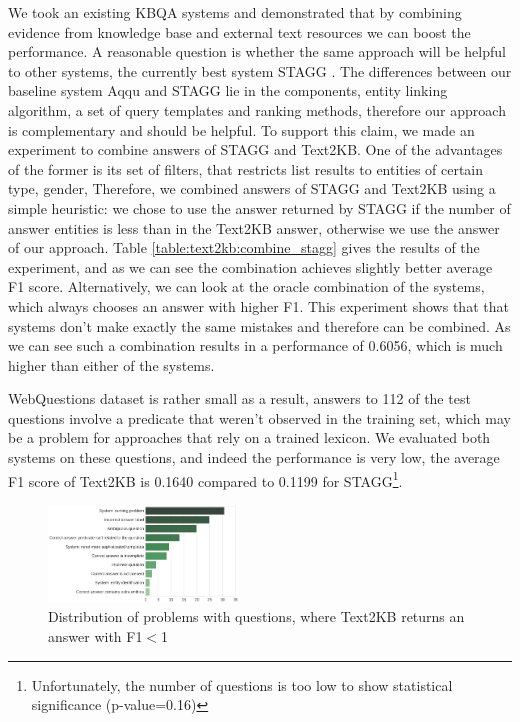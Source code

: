 We took an existing KBQA systems and demonstrated that by combining evidence from knowledge base and external text resources we can boost the performance.
A reasonable question is whether the same approach will be helpful to other systems, \eg the currently best system STAGG \cite{yih:ACL:2015:STAGG}.
The differences between our baseline system Aqqu and STAGG lie in the components, \ie entity linking algorithm, a set of query templates and ranking methods, therefore our approach is complementary and should be helpful.
To support this claim, we made an experiment to combine answers of STAGG and Text2KB.
One of the advantages of the former is its set of filters, that restricts list results to entities of certain type, gender, \etc
Therefore, we combined answers of STAGG and Text2KB using a simple heuristic: we chose to use the answer returned by STAGG if the number of answer entities is less than in the Text2KB answer, otherwise we use the answer of our approach.
Table \ref{table:text2kb:combine_stagg} gives the results of the experiment, and as we can see the combination achieves slightly better average F1 score.
Alternatively, we can look at the oracle combination of the systems, which always chooses an answer with higher F1.
This experiment shows that that systems don't make exactly the same mistakes and therefore can be combined.
As we can see such a combination results in a performance of 0.6056, which is much higher than either of the systems.

WebQuestions dataset is rather small as a result, answers to 112 of the test questions involve a predicate that weren't observed in the training set, which may be a problem for approaches that rely on a trained lexicon.
We evaluated both systems on these questions, and indeed the performance is very low, \ie the average F1 score of Text2KB is 0.1640 compared to 0.1199 for STAGG\footnote{Unfortunately, the number of questions is too low to show statistical significance (p-value=0.16)}.

\begin{figure}
\centering
\includegraphics[width=0.45\textwidth]{img/error_analysis}
\caption{Distribution of problems with questions, where Text2KB returns an answer with F1$<$1}
\label{fig:text2kb:error_analysis}
\end{figure}

